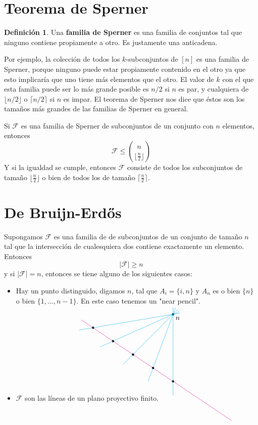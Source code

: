 \documentclass[spanish]{book}
\theoremstyle{definition}
\newtheorem*{defn}{Definición}
\begin{document}
\section{Teorema de Sperner}
\begin{defn}
	Una \textbf{familia de Sperner} es una familia de conjuntos tal que ninguno contiene propiamente a otro. Es justamente una anticadena.
\end{defn}
Por ejemplo, la colección de todos los $k$-subconjuntos de $[n]$ es una familia de Sperner, porque ninguno puede estar propiamente contenido en el otro ya que esto implicaría que uno tiene más elementos que el otro. El valor de $k$ con el que esta familia puede ser lo más grande posible es $n/2$ si $n$ es par, y cualquiera de $\lfloor n/2\rfloor$ o $\lceil n/2\rceil$ si $n$ es impar. El teorema de Sperner nos dice que éstos son los tamaños más grandes de las familias de Sperner en general.

\begin{teo}[de Sperner]
	Si $\mathcal{F}$ es una familia de Sperner de subconjuntos de un conjunto con $n$ elementos, entonces
	\[\mathcal{F}\leq{n\choose\lfloor\frac{n}{2}\rfloor}\]
	Y si la igualdad se cumple, entonces $\mathcal{F}$ consiste de todos los subconjuntos de tamaño $\lfloor\frac{n}{2}\rfloor$ o bien de todos los de tamaño $\lceil\frac{n}{2}\rceil$.
\end{teo}
\section{De Bruijn-Erdős}
\begin{teo}
	Supongamos $\mathcal{F}$ es una familia de de subconjuntos de un conjunto de tamaño $n$ tal que la intersección de cualesquiera dos contiene exactamente un elemento. Entonces
	\[|\mathcal{F}|\geq n\]
	y si $|\mathcal{F}|=n$, entonces se tiene alguno de los siguientes casos:
	\begin{itemize}
		\item Hay un punto distinguido, digamos $n$, tal que $A_i=\{i,n\}$ y $A_n$ es o bien $\{n\}$ o bien $\{1,\ldots,n-1\}$. En este caso tenemos un "near pencil".
		
		\[\begin{tikzpicture}
			\draw[magenta, shorten >=-100pt, shorten <=-20pt] (-2,4/3) -- (2,-4/3);
			
			\filldraw (2,2) circle (0.05) node[below right] {$n$};
			
			\foreach \x in {-2,-1,0,1,2} {
				\filldraw (\x,-\x*2/3) circle (0.05);
			}
			
			\foreach \x in {-2,-1,0,1,2} {
				\draw[cyan, shorten >=-10pt, shorten <=-20pt] (\x,-\x*2/3) -- (2,2);
			}
		\end{tikzpicture}
		\]
		\item $\mathcal{F}$ son las líneas de un plano proyectivo finito.
	\end{itemize}
\end{teo}
\end{document}
